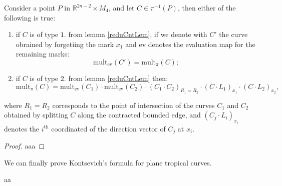 \begin{proposition}
    Consider a point $P$ in $\mathbb{R}^{2n-2}\times M_{4}$, and let $C \in \pi^{-1}(P)$, then either of the following is true:
    \begin{enumerate}
        \item if $C$ is of type $1.$ from lemma \ref{reduCntLem}, if we denote with $C'$ the curve obrained by forgetiing the mark $x_{1}$ and $\text{ev}$ denotes the evaluation map for the remaining marks:
            \[
                \text{mult}_{\text{ev}}(C') = \text{mult}_{\pi}(C);
            \]
        \item if $C$ is of type $2.$ from lemma \ref{reduCntLem} then:
            \[
                \text{mult}_{\pi}(C) = \text{mult}_{\text{ev}}(C_{1}) \cdot \text{mult}_{\text{ev}}(C_{2}) \cdot (C_{1}\cdot C_{2})_{R_{1} = R_{2}} \cdot (C\cdot L_{1})_{x_{1}} \cdot (C\cdot L_{2})_{x_{2}},
            \]
    \end{enumerate}
    where $R_{1}=R_{2}$ corresponds to the point of intersection of the curves $C_{1}$ and $C_{2}$ obtained by splitting $C$ along the contracted bounded edge, and $(C_{j}\cdot L_{i})_{x_{i}}$ denotes the $i^{\text{th}}$ coordinated of the direction vector of $C_{j}$ at $x_{i}$.
\end{proposition}
\begin{proof}
    aaa
\end{proof}

We can finally prove Kontsevich's formula for plane tropical curves.
\begin{theorem}
    aa
\end{theorem}
